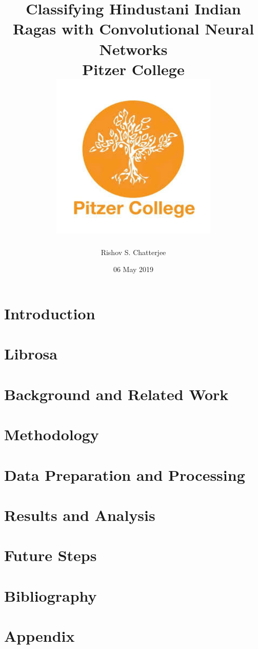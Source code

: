 \documentclass[12pt]{report}
\title{
{Classifying Hindustani Indian Ragas with Convolutional Neural Networks}\\
{\large Pitzer College}\\
{\includegraphics{university_1.png}}
}
\author{Rishov S. Chatterjee}
\date{06 May 2019}
\begin{document}
\maketitle{}
\chapter*{\centering Introduction}


\chapter*{\centering Librosa}
 

\chapter*{\centering Background and Related Work}


\chapter*{\centering Methodology}


\chapter*{\centering Data Preparation and Processing}


\chapter*{\centering Results and Analysis}


\chapter*{\centering Future Steps}


\chapter*{\centering Bibliography}


\chapter*{\centering Appendix}

\end{document}
